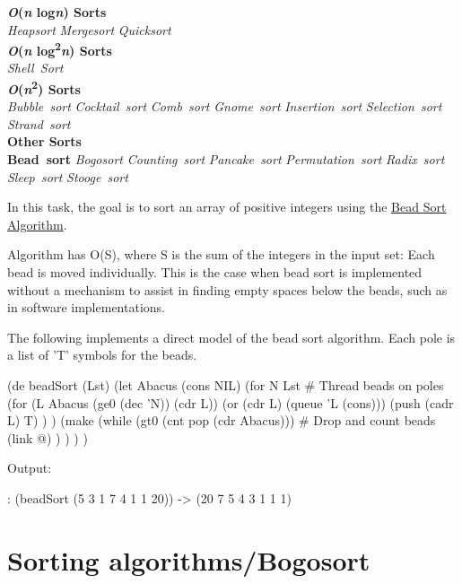 \textbf{\emph{O}(\emph{n} log\emph{n})
Sorts}\\\emph{Heapsort} \textbar{}
\emph{Mergesort} \textbar{}
\emph{Quicksort}\\\textbf{\emph{O}(\emph{n}
log\textsuperscript{2}\emph{n})
Sorts}\\\emph{Shell~Sort}\\\textbf{\emph{O}(\emph{n}\textsuperscript{2})
Sorts}\\\emph{Bubble~sort}
\textbar{}
\emph{Cocktail~sort}
\textbar{} \emph{Comb~sort}
\textbar{} \emph{Gnome~sort}
\textbar{}
\emph{Insertion~sort}
\textbar{}
\emph{Selection~sort}
\textbar{} \emph{Strand~sort}
\\\textbf{Other Sorts}\\\textbf{Bead~sort} \textbar{}
\emph{Bogosort} \textbar{}
\emph{Counting~sort}
\textbar{} \emph{Pancake~sort}
\textbar{}
\emph{Permutation~sort}
\textbar{} \emph{Radix~sort}
\textbar{} \emph{Sleep~sort}
\textbar{} \emph{Stooge~sort}

In this task, the goal is to sort an array of positive integers using
the \href{http://en.wikipedia.org/wiki/Bead\_sort}{Bead Sort Algorithm}.

Algorithm has O(S), where S is the sum of the integers in the input set:
Each bead is moved individually. This is the case when bead sort is
implemented without a mechanism to assist in finding empty spaces below
the beads, such as in software implementations.


\begin{wideverbatim}

The following implements a direct model of the bead sort algorithm.
Each pole is a list of 'T' symbols for the beads.

(de beadSort (Lst)
   (let Abacus (cons NIL)
      (for N Lst                                   # Thread beads on poles
         (for (L Abacus  (ge0 (dec 'N))  (cdr L))
            (or (cdr L) (queue 'L (cons)))
            (push (cadr L) T) ) )
      (make
         (while (gt0 (cnt pop (cdr Abacus)))       # Drop and count beads
            (link @) ) ) ) )

Output:

: (beadSort (5 3 1 7 4 1 1 20))
-> (20 7 5 4 3 1 1 1)

\end{wideverbatim}

\pagebreak{}
\section*{Sorting algorithms/Bogosort}

